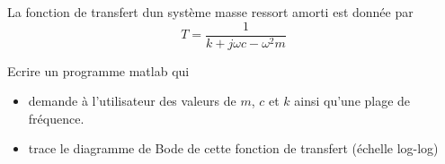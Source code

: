 \bexo


La fonction de transfert dun système masse ressort amorti est donnée par 
\begin{equation}
	T=\dfrac{1}{k+j\omega c-\omega^2m}
\end{equation}

Ecrire un programme matlab qui 
\begin{itemize}
	\item demande à l'utilisateur des valeurs de $m$, $c$ et $k$  ainsi qu'une plage de fréquence.
	\item trace le diagramme de Bode de cette fonction de transfert (échelle log-log)
\end{itemize}



 
\eexo
\solution{
}
